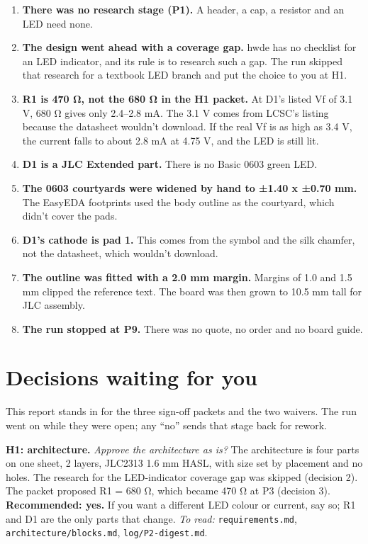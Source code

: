 \documentclass[
  10pt,
]{article}
\newcounter{none} %
\providecommand{\tightlist}{%
  \setlength{\itemsep}{0pt}\setlength{\parskip}{0pt}}
\begin{document}
\begin{enumerate}
\def\labelenumi{\arabic{enumi}.}
\tightlist
\item
  \textbf{There was no research stage (P1).} A header, a cap, a resistor
  and an LED need none.
\item
  \textbf{The design went ahead with a coverage gap.} hwde has no
  checklist for an LED indicator, and its rule is to research such a
  gap. The run skipped that research for a textbook LED branch and put
  the choice to you at H1.
\item
  \textbf{R1 is 470 Ω, not the 680 Ω in the H1 packet.} At D1's listed
  Vf of 3.1 V, 680 Ω gives only 2.4--2.8 mA. The 3.1 V comes from LCSC's
  listing because the datasheet wouldn't download. If the real Vf is as
  high as 3.4 V, the current falls to about 2.8 mA at 4.75 V, and the
  LED is still lit.
\item
  \textbf{D1 is a JLC Extended part.} There is no Basic 0603 green LED.
\item
  \textbf{The 0603 courtyards were widened by hand to ±1.40 x ±0.70 mm.}
  The EasyEDA footprints used the body outline as the courtyard, which
  didn't cover the pads.
\item
  \textbf{D1's cathode is pad 1.} This comes from the symbol and the
  silk chamfer, not the datasheet, which wouldn't download.
\item
  \textbf{The outline was fitted with a 2.0 mm margin.} Margins of 1.0
  and 1.5 mm clipped the reference text. The board was then grown to
  10.5 mm tall for JLC assembly.
\item
  \textbf{The run stopped at P9.} There was no quote, no order and no
  board guide.
\end{enumerate}

\section{Decisions waiting for you}\label{decisions-waiting-for-you}

This report stands in for the three sign-off packets and the two
waivers. The run went on while they were open; any ``no'' sends that
stage back for rework.

\textbf{H1: architecture.} \emph{Approve the architecture as is?} The
architecture is four parts on one sheet, 2 layers, JLC2313 1.6 mm HASL,
with size set by placement and no holes. The research for the
LED-indicator coverage gap was skipped (decision 2). The packet proposed
R1 = 680 Ω, which became 470 Ω at P3 (decision 3). \textbf{Recommended:
yes.} If you want a different LED colour or current, say so; R1 and D1
are the only parts that change. \emph{To read:}
\texttt{requirements.md}, \texttt{architecture/blocks.md},
\texttt{log/P2-digest.md}.
\end{document}
